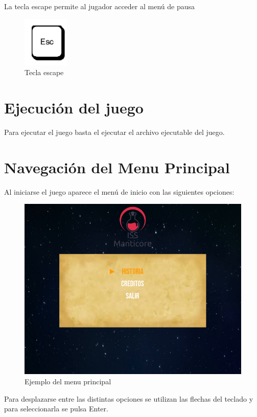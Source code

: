 La tecla escape permite al jugador acceder al menú de pausa
\begin{figure}[H]
	\centering
	\includegraphics[scale=0.50]{imagenes/escape.png}
	\caption{\label{fig:escape}Tecla escape}
\end{figure}

\section{Ejecución del juego}
Para ejecutar el juego  basta el ejecutar el archivo ejecutable del juego.

\section{Navegación del Menu Principal}
Al iniciarse el juego aparece el menú de inicio con las siguientes opciones: 

\begin{figure}[H]
	\centering
	\includegraphics[scale=0.50]{imagenes/EjemploMenuPrincipal.png}
	\caption{\label{fig:EjemploMenuPrincipal}Ejemplo del menu principal}
\end{figure}

Para desplazarse entre las distintas opciones se utilizan las flechas del teclado y para seleccionarla se pulsa Enter.  

